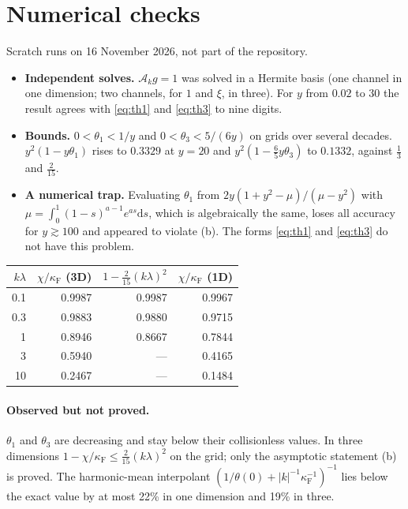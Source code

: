 \documentclass[11pt]{article}
\newcommand{\dd}{\mathrm{d}}
\newcommand{\cA}{\mathcal{A}}
\theoremstyle{remark}
\begin{document}
\section{Numerical checks}

Scratch runs on 16 November 2026, not part of the repository.
\begin{itemize}
  \item \textbf{Independent solves.} $\cA_kg=1$ was solved in a Hermite
    basis (one channel in one dimension; two channels, for $1$ and $\xi$, in
    three). For $y$ from $0.02$ to $30$ the result agrees with
    \eqref{eq:th1} and \eqref{eq:th3} to nine digits.
  \item \textbf{Bounds.} $0<\theta_1<1/y$ and $0<\theta_3<5/(6y)$ on grids
    over several decades. $y^2(1-y\theta_1)$ rises to $0.3329$ at $y=20$ and
    $y^2(1-\tfrac65y\theta_3)$ to $0.1332$, against $\tfrac13$ and
    $\tfrac{2}{15}$.
  \item \textbf{A numerical trap.} Evaluating $\theta_1$ from
    $2y(1+y^2-\mu)/(\mu-y^2)$ with
    $\mu=\int_0^1(1-s)^{a-1}e^{as}\dd s$, which is algebraically the same,
    loses all accuracy for $y\gtrsim100$ and appeared to violate (b). The
    forms \eqref{eq:th1} and \eqref{eq:th3} do not have this problem.
\end{itemize}
\begin{center}
\renewcommand{\arraystretch}{1.2}
\begin{tabular}{rrrr}
  $k\lambda$ & $\chi/\kappa_{\mathrm F}$ (3D) & $1-\tfrac{2}{15}(k\lambda)^2$
     & $\chi/\kappa_{\mathrm F}$ (1D) \\ \hline
  0.1 & 0.9987 & 0.9987 & 0.9967 \\
  0.3 & 0.9883 & 0.9880 & 0.9715 \\
  1   & 0.8946 & 0.8667 & 0.7844 \\
  3   & 0.5940 & --- & 0.4165 \\
  10  & 0.2467 & --- & 0.1484 \\
\end{tabular}
\end{center}

\paragraph{Observed but not proved.} $\theta_1$ and $\theta_3$ are
decreasing and stay below their collisionless values. In three dimensions
$1-\chi/\kappa_{\mathrm F}\le\tfrac{2}{15}(k\lambda)^2$ on the grid; only the
asymptotic statement (b) is proved. The harmonic-mean interpolant
$(1/\theta(0)+|k|^{-1}\kappa_{\mathrm F}^{-1})^{-1}$ lies below the exact
value by at most 22\% in one dimension and 19\% in three.
\end{document}
